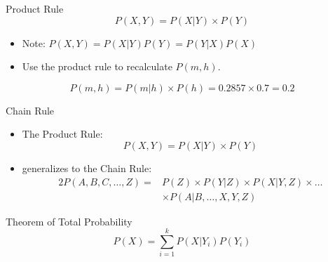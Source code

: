 \documentclass[xcolor={table}]{beamer}
\begin{document}
 \begin{frame} 
\begin{alertblock}{Product Rule}
\begin{equation*}
P(X,Y)=P(X|Y) \times P(Y)
\label{eq:probProductRule}
\end{equation*}
\end{alertblock}
\begin{itemize}
	\item Note: $P(X,Y)=P(X|Y)P(Y)=P(Y|X)P(X)$
\end{itemize}
\begin{example}
\begin{itemize}
	\item Use the product rule to recalculate $P(m,h)$.
\end{itemize}
\pause
\begin{equation*}
P(m,h) =P(m|h) \times P(h) =0.2857 \times 0.7=0.2
\end{equation*}
\end{example}

\end{frame}


\begin{frame}
\begin{alertblock}{Chain Rule}
\begin{itemize}
	\item The Product Rule:
\begin{equation*}
P(X,Y)=P(X|Y) \times P(Y)
\label{eq:probProductRule}
\end{equation*}
	\item generalizes to the Chain Rule:
\begin{alignat*}{2}
P(A,B,C,\dots,Z)=&P(Z) \times P(Y|Z) \times P(X|Y,Z) \times \dots\\
& \times P(A| B, \dots, X, Y, Z)
\end{alignat*}
\end{itemize}
\end{alertblock}
\end{frame} 



\begin{frame} 
\begin{alertblock}{Theorem of Total Probability}
\begin{equation*}
P(X)=\sum_{i=1}^{k} P(X|Y_i)P(Y_i)
\label{eq:totProb}
\end{equation*}
\end{alertblock}
\end{frame}
\end{document}
